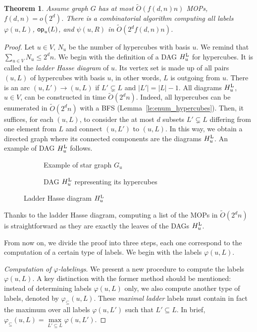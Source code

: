 \documentclass{article}
\newtheorem{theorem}{Theorem}
\newcommand{\card}[1]{\left| #1 \right|}
\newcommand{\opp}{\mbox{\textsf{op}}}
\newcommand{\hul}{H_u^{\mbox{\scriptsize{L}}}}
\newcommand{\varphis}{\varphi_{\subseteq}}
\begin{document}
\begin{theorem}
Assume graph $G$ has at most $\tilde{O}(f(d,n)n)$ MOPs, $f(d,n) = o(2^d)$. There is a combinatorial algorithm computing all labels $\varphi(u,L)$, $\opp_u(L)$, and $\psi(u,R)$ in $\tilde{O}(2^df(d,n)n)$.
\label{th:labels_mops}
\end{theorem}
\begin{proof}
Let $u \in V$, $N_u$ be the number of hypercubes with basis $u$. 
We remind that $\sum_{u \in V} N_u \le 2^dn$. We begin with the definition of a DAG $\hul$ for hypercubes. It is called the \textit{ladder Hasse diagram} of $u$. Its vertex set is made up of all pairs $(u,L)$ of hypercubes with basis $u$, in other words, $L$ is outgoing from $u$. There is an arc $(u,L')\rightarrow (u,L)$ if $L' \subsetneq L$ and $\card{L'} = \card{L} - 1$. All diagrams $\hul$, $u \in V$, can be constructed in time $\tilde{O}(2^dn)$. Indeed, all hypercubes can be enumerated in $\tilde{O}(2^dn)$ with a BFS (Lemma~\ref{le:enum_hypercubes}). Then, it suffices, for each $(u,L)$, to consider the at most $d$ subsets $L' \subsetneq L$ differing from one element from $L$ and connect $(u,L')$ to $(u,L)$. In this way, we obtain a directed graph where its connected components are the diagrams $\hul$. An example of DAG $\hul$ follows.

\begin{figure}[h]
\centering
\begin{subfigure}[b]{0.49\columnwidth}
\centering
\scalebox{0.9}{}
\caption{Example of star graph $G_u$}
\label{subfig:two_cubes}
\end{subfigure}
\begin{subfigure}[b]{0.49\columnwidth}
\centering
\scalebox{0.9}{}
\caption{DAG $\hul$ representing its hypercubes}
\label{subfig:hul}
\end{subfigure}

\caption{Ladder Hasse diagram $\hul$}
\label{fig:hul}
\end{figure}

Thanks to the ladder Hasse diagram, computing a list of the MOPs in $\tilde{O}(2^dn)$ is straightforward as they are exactly the leaves of the DAGs $\hul$.

From now on, we divide the proof into three steps, each one correspond to the computation of a certain type of labels. We begin with the labels $\varphi(u,L)$. 

\textit{Computation of $\varphi$-labelings}. 
We present a new procedure to compute the labels $\varphi(u,L)$. A key distinction with the former method should be mentioned: instead of determining labels $\varphi(u,L)$ only, we also compute another type of labels, denoted by $\varphis(u,L)$. These \textit{maximal ladder} labels must contain in fact the maximum over all labels $\varphi(u,L')$ such that $L' \subseteq L$. In brief, $\varphis(u,L) = \max\limits_{L' \subseteq L} \varphi(u,L')$.


\end{proof}
\end{document}
